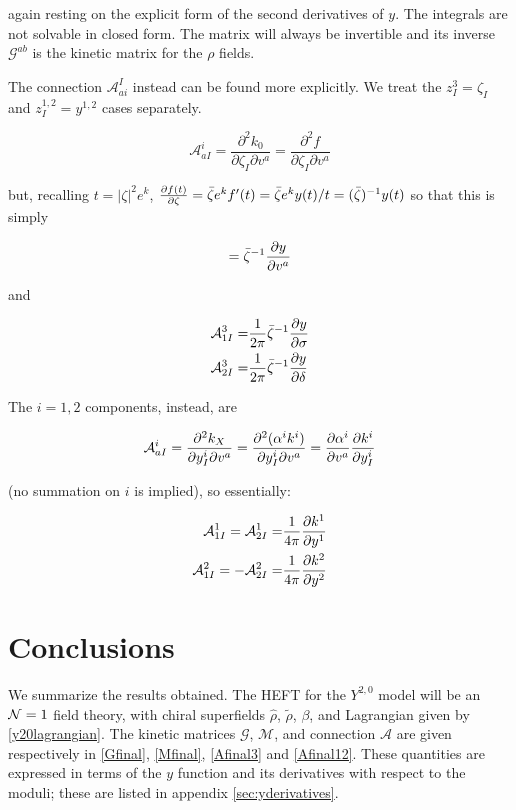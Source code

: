 again resting on the explicit form of the second derivatives of $y$. The integrals are not solvable in closed form. The matrix will always be invertible and its inverse $\mathcal{G}^{ab}$ is the kinetic matrix for the $\rho$ fields.

The connection $\mathcal{A}_{ai}^I$ instead can be found more explicitly. We treat the $z_I^3 = \zeta_I$ and $z_I^{1,2} = y^{1,2}$ cases separately.

\begin{equation}
	\mathcal{A}_{aI}^i = \frac{\partial^2 k_0}{\partial \zeta_I \partial v^a} = \frac{\partial^2 f}{\partial \zeta_I \partial v^a}
	\label{}
\end{equation}

but, recalling $t = |\zeta|^2 e^k$, $\frac{\partial f(t)}{\partial\zeta} = \bar \zeta e^k f'(t) =\bar \zeta e^k y(t)/t = (\bar \zeta)^{-1} y(t)$ so that this is simply

\begin{equation}
	= \bar \zeta^{-1} \frac{\partial y}{\partial v^a}	\label{}
\end{equation}

and

\begin{align}
	\mathcal{A}_{1I}^3 =& \frac{1}{2\pi} \bar \zeta^{-1} \frac{\partial y}{\partial\sigma}\\
	\mathcal{A}_{2I}^3 =& \frac{1}{2\pi} \bar \zeta^{-1} \frac{\partial y}{\partial\delta}
	\label{Afinal3}
\end{align}

The $i=1,2$ components, instead, are

\begin{equation}
	\mathcal{A}_{aI}^i = \frac{\partial^2 k_X}{\partial y_I^i \partial v^a} = \frac{\partial^2 (\alpha^i k^i)}{\partial y_I^i \partial v^a}  = \frac{\partial\alpha^i}{\partial v^a} \frac{\partial k^i}{\partial y_I^i}
	\label{Afinal12}
\end{equation}

(no summation on $i$ is implied), so essentially:

\begin{align}
	\mathcal{A}_{1I}^1 = \mathcal{A}_{2I}^1 = & \frac{1}{4\pi} \frac{\partial k^1}{\partial y^1} \\
	\mathcal{A}_{1I}^2 = - \mathcal{A}_{2I}^2 = & \frac{1}{4\pi} \frac{\partial k^2}{\partial y^2} \\
	\label{}
\end{align}



\section{Conclusions}

We summarize the results obtained. The HEFT for the $Y^{2,0}$ model will be an $\mathcal{N} = 1$ field theory, with chiral superfields $\hat \rho$, $\tilde \rho$, $\beta$, and Lagrangian given by \eqref{y20lagrangian}. The kinetic matrices $\mathcal{G}$, $\mathcal{M}$, and connection $\mathcal{A}$ are given respectively in \eqref{Gfinal}, \eqref{Mfinal}, \eqref{Afinal3} and \eqref{Afinal12}. These quantities are expressed in terms of the $y$ function and its derivatives with respect to the moduli; these are listed in appendix \ref{sec:yderivatives}.

